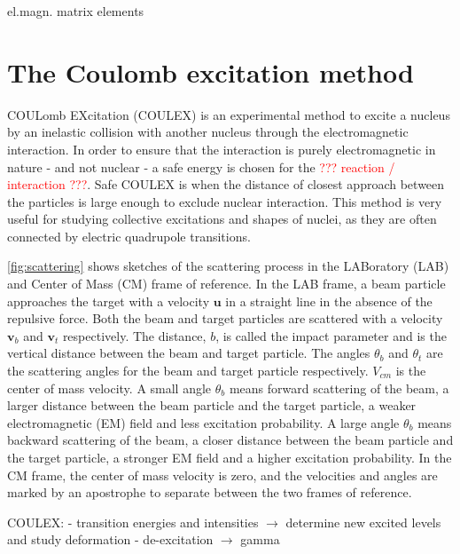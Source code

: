 \documentclass[twoside,english]{uiofysmaster/uiofysmaster}
\let\orgautoref\autoref
\renewcommand{\autoref}
        {%
		 \def\sectionautorefname{Section}%
		 \def\subsectionautorefname{Section}%
		 \def\subsubsectionautorefname{Section}%
		 \def\chapterautorefname{Chapter}%
          \orgautoref}
\begin{document}
el.magn. matrix elements



\section{The Coulomb excitation method}\label{sec:Coulex}

COULomb EXcitation (COULEX) is an experimental method to excite a nucleus by an inelastic collision with another nucleus through the electromagnetic interaction. 
In order to ensure that the interaction is purely electromagnetic in nature - and not nuclear - a safe energy is chosen for the \textcolor{red}{??? reaction / interaction ???}. 
Safe COULEX is when the distance of closest approach between the particles is large enough to exclude nuclear interaction.
This method is very useful for studying collective excitations and shapes of nuclei, as they are often connected by electric quadrupole transitions.  



\autoref{fig:scattering} shows sketches of the scattering process in the LABoratory (LAB) and Center of Mass (CM) frame of reference. 
In the LAB frame, a beam particle approaches the target with a velocity $\mathbf{u}$ in a straight line in the absence of the repulsive force. 
Both the beam and target particles are scattered with a velocity $\mathbf{v}_b$ and $\mathbf{v}_t$ respectively.
The distance, $b$, is called the impact parameter and is the vertical distance between the beam and target particle. 
The angles $\theta_b$ and $\theta_t$ are the scattering angles for the beam and target particle respectively. 
$V_{cm}$ is the center of mass velocity. 
A small angle $\theta_b$ means forward scattering of the beam, a larger distance between the beam particle and the target particle, a weaker electromagnetic (EM) field and less excitation probability. 
A large angle $\theta_b$ means backward scattering of the beam, a closer distance between the beam particle and the target particle, a stronger EM field and a higher excitation probability.
In the CM frame, the center of mass velocity is zero, and the velocities and angles are marked by an apostrophe to separate between the two frames of reference.


\bigskip

COULEX: \newline
- transition energies and intensities $\rightarrow$ determine new excited levels and study deformation \newline
- de-excitation $\rightarrow$ gamma
\end{document}

